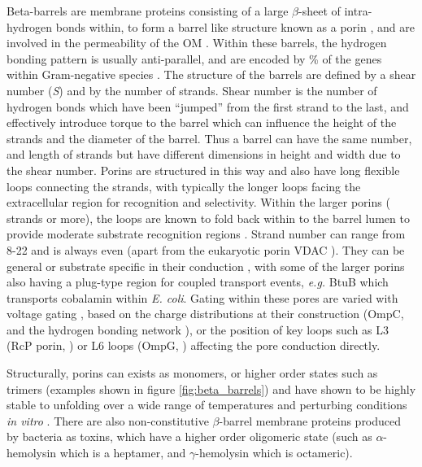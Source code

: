 Beta-barrels are membrane proteins consisting of a large $\beta$-sheet of intra-hydrogen bonds  within, to form a barrel like structure known as a porin \cite{Lasters1988,Murzin1994}, and are involved in the permeability of the OM \cite{Hancock1987}. Within these barrels, the hydrogen bonding pattern is usually anti-parallel,  and are encoded by  \% of the genes within Gram-negative species \cite{Wimley2003}. The structure of the barrels are defined by a  shear number (\textit{S}) and by the number of strands. Shear number is the number of hydrogen bonds which have been ``jumped'' from the first strand to the last, and effectively introduce torque to the barrel which can influence the height of the strands and the diameter of the barrel. Thus a barrel can have the same number, and length of strands but have different dimensions in height and width due to the shear number. Porins are structured in this way and also have long flexible loops connecting the strands, with typically the longer loops facing the extracellular region for recognition and selectivity. Within the larger porins ( strands or more), the loops are known to fold back within to the barrel lumen to provide moderate substrate recognition regions \cite{Tamm2001,Schulz2002,Fairman2011}.  Strand number can range from 8-22 and is always even (apart from the eukaryotic porin VDAC \cite{Bayrhuber2008,Ujwal2008}). They can be general \cite{Rosenbusch1974a,Schenkman1984a,Schirmer1998} or substrate specific in their conduction \cite{Schulz1996,Pages2008}, with some of the larger porins also having a plug-type region for coupled transport events, \textit{e.g.} BtuB which transports cobalamin within \textit{E. coli}. Gating within these pores are varied with voltage gating \cite{Lakey1987}, based on the charge distributions at their construction (OmpC, \cite{Liu2000} and the hydrogen bonding network \cite{Liu1998a}), or the position of key loops such as L3 (RcP porin, \cite{Soares1995}) or L6 loops (OmpG, \cite{Chen2008}) affecting the pore conduction directly. 


Structurally, porins can exists as monomers, or higher order states such as trimers (examples shown in figure \ref{fig:beta_barrels}) and have shown to be highly stable to unfolding over a wide range of temperatures and perturbing conditions \textit{in vitro} \cite{Moon2013}. There are also non-constitutive $\beta$-barrel membrane proteins produced by bacteria as toxins, which have a higher order oligomeric state (such as $\alpha$-hemolysin which is a heptamer, and $\gamma$-hemolysin which is octameric).

